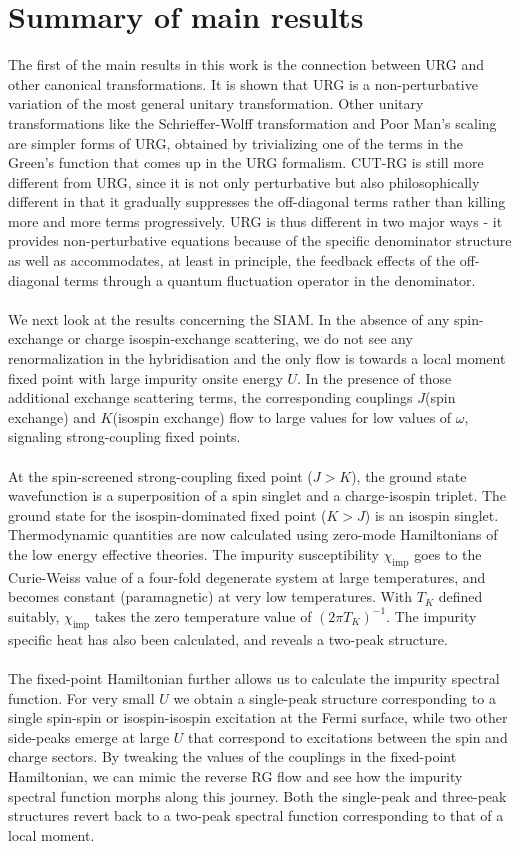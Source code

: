\documentclass[twoside,11pt]{report}
\numberwithin{equation}{section}
\begin{document}
\section{Summary of main results}
The first of the main results in this work is the connection between URG and other canonical transformations. It is shown that URG is a non-perturbative variation of the most general unitary transformation. Other unitary transformations like the Schrieffer-Wolff transformation and Poor Man's scaling are simpler forms of URG, obtained by trivializing one of the terms in the Green's function that comes up in the URG formalism. CUT-RG is still more different from URG, since it is not only perturbative but also philosophically different in that it gradually suppresses the off-diagonal terms rather than killing more and more terms progressively. URG is thus different in two major ways - it provides non-perturbative equations because of the specific denominator structure as well as accommodates, at least in principle, the feedback effects of the off-diagonal terms through a quantum fluctuation operator in the denominator.
\\\\We next look at the results concerning the SIAM. In the absence of any spin-exchange or charge isospin-exchange scattering, we do not see any renormalization in the hybridisation and the only flow is towards a local moment fixed point with large impurity onsite energy \(U\). In the presence of those additional exchange scattering terms, the corresponding couplings \(J\)(spin exchange) and \(K\)(isospin exchange) flow to large values for low values of \(\omega\), signaling strong-coupling fixed points.
\\\\At the spin-screened strong-coupling fixed point (\(J>K\)), the ground state wavefunction is a superposition of a spin singlet and a charge-isospin triplet. The ground state for the isospin-dominated fixed point (\(K>J\)) is an isospin singlet. Thermodynamic quantities are now calculated using zero-mode Hamiltonians of the low energy effective theories. The impurity susceptibility \(\chi_\text{imp}\) goes to the Curie-Weiss value of a four-fold degenerate system at large temperatures, and becomes constant (paramagnetic) at very low temperatures. With \(T_K\) defined suitably, \(\chi_\text{imp}\) takes the zero temperature value of \(\left( 2\pi T_K \right) ^{-1}\). The impurity specific heat has also been calculated, and reveals a two-peak structure.
\\\\The fixed-point Hamiltonian further allows us to calculate the impurity spectral function. For very small \(U\) we obtain a single-peak structure corresponding to a single spin-spin or isospin-isospin excitation at the Fermi surface, while two other side-peaks emerge at large \(U\) that correspond to excitations between the spin and charge sectors. By tweaking the values of the couplings in the fixed-point Hamiltonian, we can mimic the reverse RG flow and see how the impurity spectral function morphs along this journey. Both the single-peak and three-peak structures revert back to a two-peak spectral function corresponding to that of a local moment.
\end{document}
